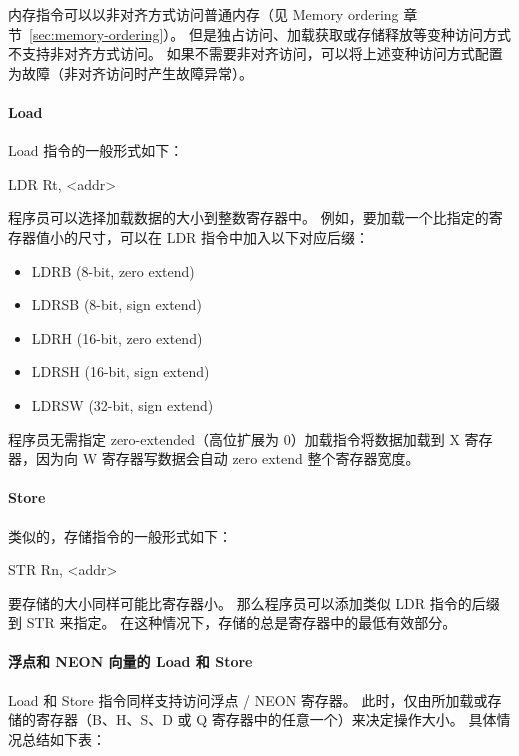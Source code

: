内存指令可以以非对齐方式访问普通内存（见 Memory ordering 章节~\ref{sec:memory-ordering}）。
但是独占访问、加载获取或存储释放等变种访问方式不支持非对齐方式访问。
如果不需要非对齐访问，可以将上述变种访问方式配置为故障（非对齐访问时产生故障异常）。

\paragraph{Load}

Load 指令的一般形式如下：

\begin{lstcode}[language={[ARM]Assembler}]
  LDR Rt, <addr>
\end{lstcode}

程序员可以选择加载数据的大小到整数寄存器中。
例如，要加载一个比指定的寄存器值小的尺寸，可以在 LDR 指令中加入以下对应后缀：
\begin{itemize}
  \item LDRB (8-bit, zero extend)
  \item LDRSB (8-bit, sign extend)
  \item LDRH (16-bit, zero extend)
  \item LDRSH (16-bit, sign extend)
  \item LDRSW (32-bit, sign extend)
\end{itemize}

程序员无需指定 zero-extended（高位扩展为 0）加载指令将数据加载到 X 寄存器，因为向 W 寄存器写数据会自动 zero extend 整个寄存器宽度。

\paragraph{Store}

类似的，存储指令的一般形式如下：

\begin{lstcode}[language={[ARM]Assembler}]
  STR Rn, <addr>
\end{lstcode}

要存储的大小同样可能比寄存器小。
那么程序员可以添加类似 LDR 指令的后缀到 STR 来指定。
在这种情况下，存储的总是寄存器中的最低有效部分。

\paragraph{浮点和 NEON 向量的 Load 和 Store}

Load 和 Store 指令同样支持访问浮点 / NEON 寄存器。
此时，仅由所加载或存储的寄存器（B、H、S、D 或 Q 寄存器中的任意一个）来决定操作大小。
具体情况总结如下表：

